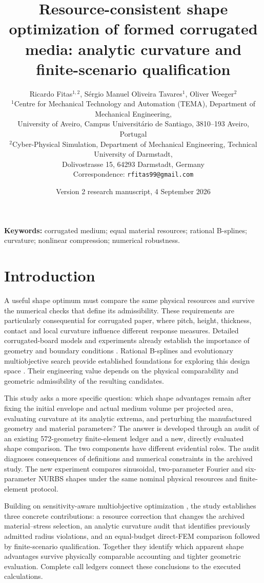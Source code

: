 \documentclass[10pt,twocolumn]{article}
\title{Resource-consistent shape optimization of formed corrugated media: analytic curvature and finite-scenario qualification}
\author{Ricardo Fitas$^{1,2}$, S\'ergio Manuel Oliveira Tavares$^1$, Oliver Weeger$^2$\\[3pt]
\small $^1$Centre for Mechanical Technology and Automation (TEMA), Department of Mechanical Engineering,\\
\small University of Aveiro, Campus Universit\'ario de Santiago, 3810--193 Aveiro, Portugal\\
\small $^2$Cyber-Physical Simulation, Department of Mechanical Engineering, Technical University of Darmstadt,\\
\small Dolivostrasse 15, 64293 Darmstadt, Germany\\
\small Correspondence: \texttt{rfitas99@gmail.com}}
\date{Version 2 research manuscript, 4 September 2026}
\begin{document}
\raggedbottom
\maketitle
\begin{abstract}

\end{abstract}
\noindent\textbf{Keywords:} corrugated medium; equal material resources; rational B-splines; curvature; nonlinear compression; numerical robustness.

\section{Introduction}
A useful shape optimum must compare the same physical resources and survive the numerical checks that define its admissibility. These requirements are particularly consequential for corrugated paper, where pitch, height, thickness, contact and local curvature influence different response measures. Detailed corrugated-board models and experiments already establish the importance of geometry and boundary conditions \citep{Talbi2009,Park2021Flat,DiRusso2023}. Rational B-splines and evolutionary multiobjective search provide established foundations for exploring this design space \citep{Piegl1997,Deb2002}. Their engineering value depends on the physical comparability and geometric admissibility of the resulting candidates.

This study asks a more specific question: which shape advantages remain after fixing the initial envelope and actual medium volume per projected area, evaluating curvature at its analytic extrema, and perturbing the manufactured geometry and material parameters? The answer is developed through an audit of an existing 572-geometry finite-element ledger and a new, directly evaluated shape comparison. The two components have different evidential roles. The audit diagnoses consequences of definitions and numerical constraints in the archived study. The new experiment compares sinusoidal, two-parameter Fourier and six-parameter NURBS shapes under the same nominal physical resources and finite-element protocol.

Building on sensitivity-aware multiobjective optimization \citep{DebGupta2006}, the study establishes three concrete contributions: a resource correction that changes the archived material--stress selection, an analytic curvature audit that identifies previously admitted radius violations, and an equal-budget direct-FEM comparison followed by finite-scenario qualification. Together they identify which apparent shape advantages survive physically comparable accounting and tighter geometric evaluation. Complete call ledgers connect these conclusions to the executed calculations.
\end{document}
